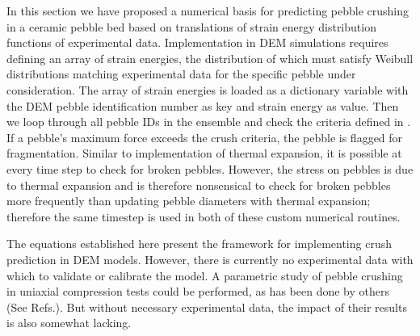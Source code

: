 In this section we have proposed a numerical basis for predicting pebble crushing in a ceramic pebble bed based on translations of strain energy distribution functions of experimental data. Implementation in DEM simulations requires defining an array of strain energies, the distribution of which must satisfy Weibull distributions matching experimental data for the specific pebble under consideration. The array of strain energies is loaded as a dictionary variable with the DEM pebble identification number as key and strain energy as value. Then we loop through all pebble IDs in the ensemble and check the criteria defined in . If a pebble's maximum force exceeds the crush criteria, the pebble is flagged for fragmentation. Similar to implementation of thermal expansion, it is possible at every time step to check for broken pebbles. However, the stress on pebbles is due to thermal expansion and is therefore nonsensical to check for broken pebbles more frequently than updating pebble diameters with thermal expansion; therefore the same timestep is used in both of these custom numerical routines. 

The equations established here present the framework for implementing crush prediction in DEM models. However, there is currently no experimental data with which to validate or calibrate the model. A parametric study of pebble crushing in uniaxial compression tests could be performed, as has been done by others (See Refs.\cite{Annabattula2012a,Zhao2013}). But without necessary experimental data, the impact of their results is also somewhat lacking.
